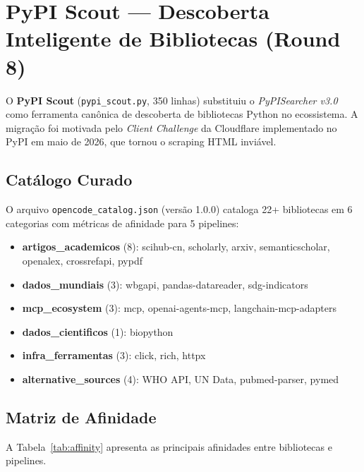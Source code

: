\documentclass[12pt,a4paper]{article}
\begin{document}
\section{PyPI Scout — Descoberta Inteligente de Bibliotecas (Round 8)}

O \textbf{PyPI Scout} (\texttt{pypi\_scout.py}, 350 linhas) substituiu o \textit{PyPISearcher v3.0} como ferramenta canônica de descoberta de bibliotecas Python no ecossistema. A migração foi motivada pelo \textit{Client Challenge} da Cloudflare implementado no PyPI em maio de 2026, que tornou o scraping HTML inviável.

\subsection{Catálogo Curado}

O arquivo \texttt{opencode\_catalog.json} (versão 1.0.0) cataloga 22+ bibliotecas em 6 categorias com métricas de afinidade para 5 pipelines:

\begin{itemize}[itemsep=1pt]
  \item \textbf{artigos\_academicos} (8): scihub-cn, scholarly, arxiv, semanticscholar, openalex, crossrefapi, pypdf
  \item \textbf{dados\_mundiais} (3): wbgapi, pandas-datareader, sdg-indicators
  \item \textbf{mcp\_ecosystem} (3): mcp, openai-agents-mcp, langchain-mcp-adapters
  \item \textbf{dados\_cientificos} (1): biopython
  \item \textbf{infra\_ferramentas} (3): click, rich, httpx
  \item \textbf{alternative\_sources} (4): WHO API, UN Data, pubmed-parser, pymed
\end{itemize}

\subsection{Matriz de Afinidade}

A Tabela~\ref{tab:affinity} apresenta as principais afinidades entre bibliotecas e pipelines.
\end{document}
